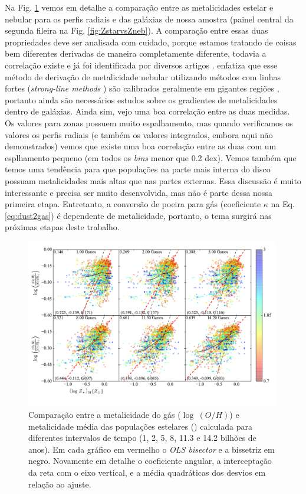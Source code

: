 Na Fig. \ref{fig:compareZR} vemos em detalhe a comparação entre as metalicidades estelar e nebular
para os perfis radiais e das galáxias de nossa amostra (painel central da segunda fileira na Fig.
\ref{fig:ZstarvsZneb}). A comparação entre essas duas propriedades deve ser analisada com cuidado,
porque estamos tratando de coisas bem diferentes derivadas de maneira completamente diferente,
todavia a correlação existe e já foi identificada por diversos artigos
\citep{CidFernandes.etal.2005a, Gallazzi.etal.2005a, CidFernandes.etal.2007a, Asari.etal.2007a}.
\citet{Stasinska.etal.2006a} enfatiza que esse método de derivação de metalicidade nebular
utilizando métodos com linhas fortes ({\em strong-line methods} \citep{Pagel.etal.1979a}) são
calibrados geralmente em gigantes regiões \Hii, portanto ainda são necessários estudos sobre os
gradientes de metalicidades dentro de galáxias. Ainda sim, vejo uma boa correlação entre as duas
medidas. Os valores para zonas possuem muito espalhamento, mas quando verificamos os valores os
perfis radiais (e também os valores integrados, embora aqui não demonstrados) vemos que existe uma
boa correlação entre as duas com um esplhamento pequeno (em todos os {\em bins} menor que 0.2 dex).
Vemos também que temos uma tendência para que populações na parte mais interna do disco possuam
metalicidades mais altas que nas partes externas. Essa discussão é muito interessante e precisa ser
muito desenvolvida, mas não é parte dessa nossa primeira etapa. Entretanto, a conversão de poeira
para gás (coeficiente $\kappa$ na Eq. \ref{eq:dust2gas}) é dependente de metalicidade, portanto, o
tema surgirá nas próximas etapas deste trabalho.

\begin{figure}
	\centering
	\includegraphics[width=0.99\textwidth]{figuras/CompareZR.pdf}
	\caption[ vs. $\log\ (O/H)$ - perfis radiais]
	{Comparação entre a metalicidade do gás ($\log\ (O/H)$) e metalicidade média das populações
estelares () calculada para diferentes intervalos de tempo (1, 2, 5, 8, 11.3 e
14.2 bilhões de anos). Em cada gráfico em vermelho o {\em OLS bisector} e a bissetriz em negro.
Novamente em detalhe o coeficiente angular, a interceptação da reta com o eixo vertical, e a média
quadráticas dos desvios em relação ao ajuste.}
	\label{fig:compareZR}
\end{figure}

